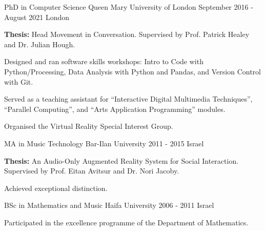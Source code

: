\documentclass[11pt, a4paper]{awesome-cv}
\begin{document}


\begin{cventries}

  \cventry
    {PhD in Computer Science}
    {Queen Mary University of London}
    {September 2016 - August 2021}
    {London}
    {
      \begin{cvitems}
        \item {\textbf{Thesis:} Head Movement in Conversation. Supervised by Prof. Patrick Healey and Dr. Julian Hough.}
        \item {Designed and ran software skills workshops: Intro to Code with Python/Processing, Data Analysis with Python and Pandas, and Version Control with Git.}
        \item {Served as a teaching assistant for ``Interactive Digital Multimedia Techniques'', ``Parallel Computing'', and ``Arts Application Programming'' modules.}
        \item {Organised the Virtual Reality Special Interest Group.}
      \end{cvitems}
    }

  \cventry
    {MA in Music Technology}
    {Bar-Ilan University}
    {2011 - 2015}
    {Israel}
    {
      \begin{cvitems}
        \item {\textbf{Thesis:} An Audio-Only Augmented Reality System for Social Interaction. Supervised by Prof. Eitan Avitsur and Dr. Nori Jacoby.}
        \item {Achieved exceptional distinction.}
      \end{cvitems}
    }

  \cventry
    {BSc in Mathematics and Music}
    {Haifa University}
    {2006 - 2011}
    {Israel}
    {
      \begin{cvitems}
        \item {Participated in the excellence programme of the Department of Mathematics.}
      \end{cvitems}
    }

\end{cventries}


\end{document}
